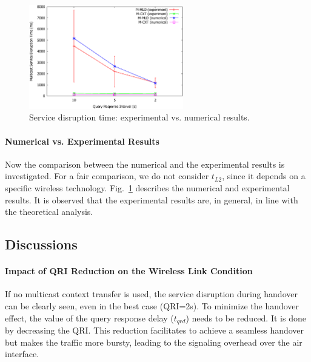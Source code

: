 \begin{figure}[h!] 
 \begin{center} 
 \includegraphics[width=0.60\textwidth]{./Part2/Chapter4/figures/c6_comparision.eps} 
    \caption[The multicast service disruption time: experimental vs. numerical results.]{Service disruption time: experimental vs. numerical results.}
     \label{fig:c6_comparision}
  \end{center} 
\end{figure}
\paragraph{Numerical vs. Experimental Results} Now the comparison between the numerical and the experimental results is investigated. For a fair comparison, we do not consider $t_{L2}$, since it depends on a specific wireless technology. Fig.~\ref{fig:c6_comparision} describes the numerical and experimental results. It is observed that the experimental results are, in general, in line with the theoretical analysis.
\subsection{Discussions}
\paragraph{Impact of QRI Reduction on the Wireless Link Condition}
If no multicast context transfer is used, the service disruption during handover can be clearly seen, even in the best case (QRI=2s). To minimize the handover effect, the value of the query response delay ($t_{qrd}$) needs to be reduced. It is done by decreasing the QRI. This reduction facilitates to achieve a seamless handover but makes the traffic more bursty, leading to the signaling overhead over the air interface. 

